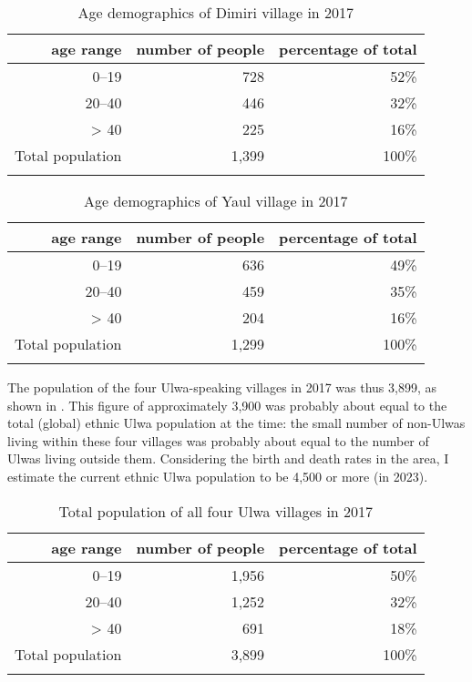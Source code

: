 \begin{table}
\caption{\label{tab:1.10} Age demographics of  Dimiri village in 2017}
\begin{tabular}{rrr}
\lsptoprule
age range & number of people & percentage of total\\
\midrule
0--19 & 728 & 52\%\\
20--40 & 446 & 32\%\\
> 40 & 225 & 16\%\\
\midrule
Total population & 1,399 & 100\%\\
\lspbottomrule
\end{tabular}
\end{table}

\begin{table}
\caption{Age demographics of Yaul village in 2017}
\label{tab:1.11}
\begin{tabular}{rrr}
\lsptoprule
age range & number of people & percentage of total\\
\midrule
0--19 & 636 & 49\%\\
20--40 & 459 & 35\%\\
> 40 & 204 & 16\%\\
\midrule
Total population & 1,299 & 100\%\\
\lspbottomrule
\end{tabular}
\end{table}

The population of the four Ulwa-speaking villages in 2017 was thus 3,899, as shown in . This figure of approximately 3,900 was probably about equal to the total (global) ethnic Ulwa population at the time: the small number of non-Ulwas living within these four villages was probably about equal to the number of Ulwas living outside them. Considering the birth and death rates in the area, I estimate the current ethnic Ulwa population to be 4,500 or more (in 2023).

\begin{table}
\caption{Total population of all four Ulwa villages in 2017}
\label{tab:1.11a}
\begin{tabular}{rrr}
\lsptoprule
age range & number of people & percentage of total\\
\midrule
0--19 & 1,956 & 50\%\\
20--40 & 1,252 & 32\%\\
> 40 & 691 & 18\%\\
\midrule
Total population & 3,899 & 100\%\\
\lspbottomrule
\end{tabular}
\end{table}

